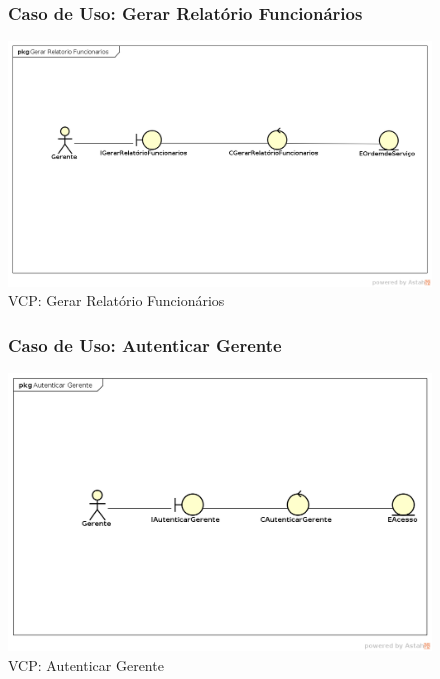 \documentclass[
	12pt,				%
	openright,
	oneside,			%
	a4paper,			%
	chapter=TITLE,		%
	brazil				%
	]{abntex2}
\begin{document}
\begin{figure}[h!]

\subsubsection*{Caso de Uso: Gerar Relatório Funcionários}

	\caption{VCP: Gerar Relatório Funcionários}
	\begin{center}
	    \includegraphics[scale=0.5]{Arquivos/Analise/V_relatorio_funcionarios}  
	\end{center}
\end{figure}






\begin{figure}[h!]

\subsubsection*{Caso de Uso: Autenticar Gerente}

	\caption{VCP: Autenticar Gerente}
	\begin{center}
	    \includegraphics[scale=0.5]{Arquivos/Analise/V_autenticar_gerente}  
	\end{center}
\end{figure}
\end{document}

